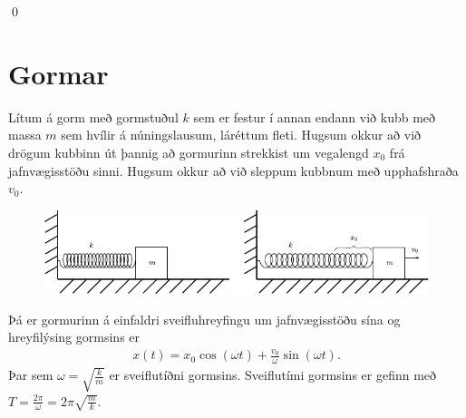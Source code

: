 \qed



\section{Gormar}

\begin{tcolorbox}
\begin{theorem} \label{law:springs}
Lítum á gorm með gormstuðul $k$ sem er festur í annan endann við kubb með massa $m$ sem hvílir á núningslausum, láréttum fleti. Hugsum okkur að við drögum kubbinn út þannig að gormurinn strekkist um vegalengd $x_0$ frá jafnvægisstöðu sinni. Hugsum okkur að við sleppum kubbnum með upphafshraða $v_0$.

\begin{figure}[H]
    \centering
    \includegraphics{figures/springsystem2.pdf}
\end{figure}
Þá er gormurinn á einfaldri sveifluhreyfingu um jafnvægisstöðu sína og hreyfilýsing gormsins er
\begin{align*}
    x(t) = x_0 \cos(\omega t) + \frac{v_0}{\omega} \sin(\omega t).
\end{align*}
Þar sem $\omega = \sqrt{\frac{k}{m}}$ er sveiflutíðni gormsins. Sveiflutími gormsins er gefinn með $T = \frac{2\pi}{\omega} = 2\pi \sqrt{\frac{m}{k}}$.
\end{theorem}
\end{tcolorbox}


